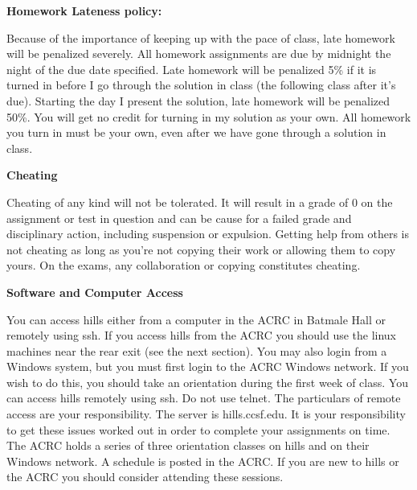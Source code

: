 \documentclass[11pt]{article}
\begin{document}
\textbf {Homework Lateness policy:}

\hspace{3mm}

        Because of the importance of keeping up with the pace of class, late
        homework will be penalized severely. All homework assignments are due
        by midnight the night of the due date specified. Late homework will be
        penalized 5\% if it is turned in before I go through the solution in
        class (the following class after it's due). Starting the day I present
        the solution, late homework will be penalized 50\%. You will get no
        credit for turning in my solution as your own. All homework you turn in
        must be your own, even after we have gone through a solution in class.

\hspace{3mm}

\textbf{Cheating}

\hspace{3mm}

Cheating of any kind will not be tolerated. It will result in a grade of 0 on
the assignment or test in question and can be cause for a failed grade and
disciplinary action, including suspension or expulsion. Getting help from
others is not cheating as long as you're not copying their work or allowing
them to copy yours. On the exams, any collaboration or copying constitutes
cheating.

\hspace{3mm}

\textbf{Software and Computer Access}

\hspace{3mm}

You can access hills either from a computer in the ACRC in Batmale Hall or
remotely using ssh. If you access hills from the ACRC you should use the linux
machines near the rear exit (see the next section). You may also login from a
Windows system, but you must first login to the ACRC Windows network. If you
wish to do this, you should take an orientation during the first week of class.
You can access hills remotely using ssh. Do not use telnet. The particulars of
remote access are your responsibility.  The server is hills.ccsf.edu. It is
your responsibility to get these issues worked out in order to complete your
assignments on time.  The ACRC holds a series of three orientation classes on
hills and on their Windows network. A schedule is posted in the ACRC. If you
are new to hills or the ACRC you should consider attending these sessions.
\end{document}
